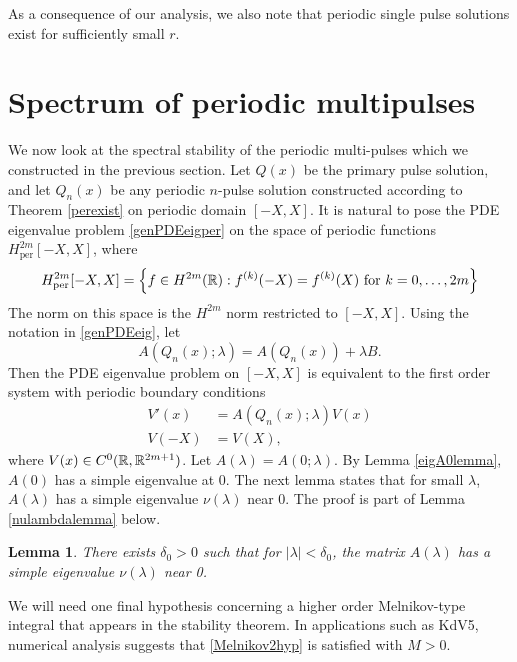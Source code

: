 \documentclass[11pt,reqno]{amsart}
\theoremstyle{plain}
\newtheorem{lemma}[theorem]{Lemma}
\theoremstyle{definition}
\theoremstyle{remark}
\begin{document}
As a consequence of our analysis, we also note that periodic single pulse solutions exist for sufficiently small $r$.

\section{Spectrum of periodic multipulses}\label{sec:perstab}

We now look at the spectral stability of the periodic multi-pulses which we constructed in the previous section. Let $Q(x)$ be the primary pulse solution, and let $Q_n(x)$ be any periodic $n$-pulse solution constructed according to Theorem \ref{perexist} on periodic domain $[-X, X]$. It is natural to pose the PDE eigenvalue problem \cref{genPDEeigper} on the space of periodic functions $H^{2m}_{\text{per}}[-X,X]$, where
\[
H^{2m}_{\text{per}}[-X,X] = \left\{ f \in H^{2m}(\mathbb{R}) : f^{(k)}(-X) = f^{(k)}(X) \text{ for } k = 0, \dots, 2m \right\} 
\]
The norm on this space is the $H^{2m}$ norm restricted to $[-X, X]$. Using the notation in \cref{genPDEeig}, let
\begin{equation}\label{AQnlambda}
A(Q_n(x); \lambda) = A(Q_n(x)) + \lambda B.
\end{equation}
Then the PDE eigenvalue problem on $[-X, X]$ is equivalent to the first order system with periodic boundary conditions
\begin{equation}\label{PDEeigsystemper3}
\begin{aligned}
V'(x) &= A(Q_n(x); \lambda)V(x) \\
V(-X) &= V(X),
\end{aligned}
\end{equation}
where $V(x) \in C^0(\mathbb{R},\mathbb{R}^{2m+1})$. Let $A(\lambda) = A(0; \lambda)$. By Lemma \ref{eigA0lemma}, $A(0)$ has a simple eigenvalue at 0. The next lemma states that for small $\lambda$, $A(\lambda)$ has a simple eigenvalue $\nu(\lambda)$ near 0. The proof is part of Lemma \ref{nulambdalemma} below.

\begin{lemma}\label{nulambdalemmasimple}
There exists $\delta_0 > 0$ such that for $|\lambda| < \delta_0$, the matrix $A(\lambda)$ has a simple eigenvalue $\nu(\lambda)$ near 0.
\end{lemma}

We will need one final hypothesis concerning a higher order Melnikov-type integral that appears in the stability theorem. In applications such as KdV5, numerical analysis suggests that \cref{Melnikov2hyp} is satisfied with $M > 0$.
\end{document}
